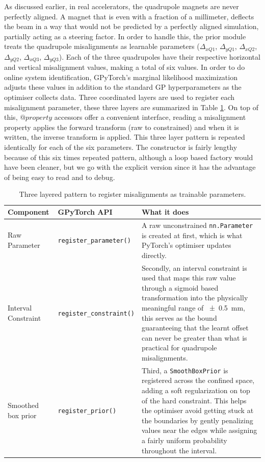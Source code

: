 As discussed earlier, in real accelerators, the quadrupole magnets are never perfectly aligned. A magnet that is even with a fraction of a millimeter, 
deflects the beam in a way that would not be predicted by a perfectly aligned simulation, partially acting as a steering factor.  
In order to handle this, the prior module treats the quadrupole misalignments as learnable parameters ($\Delta_{xQ1}$, $\Delta_{yQ1}$, $\Delta_{xQ2}$, $\Delta_{yQ2}$, $\Delta_{xQ3}$, $\Delta_{yQ3}$).
Each of the three quadrupoles have their respective horizontal and vertical misalignment values, making a total of six values. In order to do online system identification, GPyTorch’s marginal likelihood maximization 
adjusts these values in addition to the standard GP hyperparameters as the optimiser collects data. Three coordinated layers are used to register each misalignment parameter, these three 
layers are summarized in Table \ref{three_layers}. On top of this, $@property$ accessors offer a convenient interface, reading a misalignment property applies the forward transform (raw to constrained) and when 
it is written, the inverse transform is applied. This three layer pattern is repeated identically for each of the six parameters.  The constructor is fairly lengthy because of this six times repeated 
pattern, although a loop based factory would have been cleaner, but we go with the explicit version since it has the advantage of being easy to read and to debug. 

\begin{table} [htbp]
    \centering
    \small
    \begin{tabular}{p{4.0cm} p{4.0cm} p{7.0cm}}
        \toprule
        \textbf{Component} & \textbf{GPyTorch API} & \textbf{What it does} \\
        \midrule
        Raw Parameter & \texttt{register\_parameter()} & A raw unconstrained \texttt{nn.Parameter} is created at first, which is what PyTorch’s optimiser updates directly.\\
        Interval Constraint & \texttt{register\_constraint()} & Secondly, an interval constraint is used that maps this raw value through a sigmoid based transformation into the physically meaningful range of \SI{\pm0.5}{mm}, this serves as the bound guaranteeing that the learnt offset can never be greater than what is practical for quadrupole misalignments. \\ 
        Smoothed box prior & \texttt{register\_prior()} & Third, a \texttt{SmoothBoxPrior} is registered across the confined space, adding a soft regularization on top of the hard constraint. This helps the optimiser avoid getting stuck at the boundaries by gently penalizing values near the edges while assigning a fairly uniform probability throughout the interval. \\ 
        \bottomrule
    \end{tabular}
    \caption{Three layered pattern to register misalignments as trainable parameters.}
    \label{three_layers}
\end{table}

